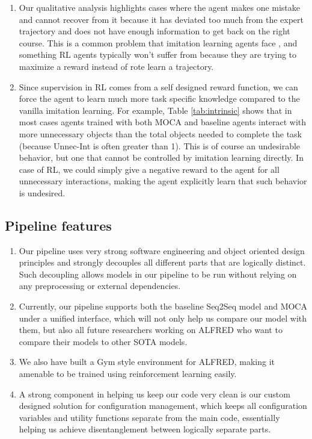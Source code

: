 \documentclass[11pt,a4paper]{article}
\begin{document}
\begin{enumerate}
    \item Our qualitative analysis highlights cases where the agent makes one mistake and cannot recover from it because it has deviated too much from the expert trajectory and does not have enough information to get back on the right course. This is a common problem that imitation learning agents face \cite{ross2011reduction}, and something RL agents typically won't suffer from because they are trying to maximize a reward instead of rote learn a trajectory.
    \item Since supervision in RL comes from a self designed reward function, we can force the agent to learn much more task specific knowledge compared to the vanilla imitation learning. For example, Table \ref{tab:intrinsic} shows that in most cases agents trained with both MOCA and baseline agents interact with more unnecessary objects than the total objects needed to complete the task (because Unnec-Int is often greater than 1). This is of course an undesirable behavior, but one that cannot be controlled by imitation learning directly. In case of RL, we could simply give a negative reward to the agent for all unnecessary interactions, making the agent explicitly learn that such behavior is undesired.
\end{enumerate}


\subsection{Pipeline features}
\label{app:code}

\begin{enumerate}
    \item Our pipeline uses very strong software engineering and object oriented design principles and strongly decouples all different parts that are logically distinct. Such decoupling allows models in our pipeline to be run without relying on any preprocessing or external dependencies.
    \item Currently, our pipeline supports both the baseline Seq2Seq model and MOCA under a unified interface, which will not only help us compare our model with them, but also all future researchers working on ALFRED who want to compare their models to other SOTA models.
    \item We also have built a Gym style \cite{brockman2016openai} environment for ALFRED, making it amenable to be trained using reinforcement learning easily.
    \item A strong component in helping us keep our code very clean is our custom designed solution for configuration management, which keeps all configuration variables and utility functions separate from the main code, essentially helping us achieve disentanglement between logically separate parts.
\end{enumerate}
\end{document}
